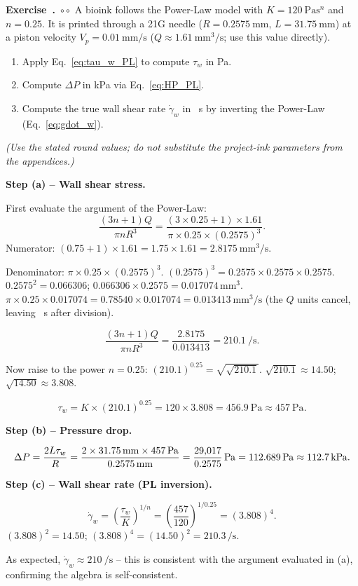 \documentclass[11pt,a4paper]{article}
\newcommand{\diffB}{\textcolor{orange!80!black}{$\circ\circ$}}
\newcounter{exidx}[section]
\renewcommand{\theexidx}{\thesection.\arabic{exidx}}
\newenvironment{exercise}[1]%
  {\par\smallskip\refstepcounter{exidx}%
   \noindent\textbf{Exercise~\theexidx}~#1\quad}
  {\par\smallskip}
\newcommand{\gd}{\dot{\gamma}}
\begin{document}
\begin{exercise}{\diffB}
A bioink follows the Power-Law model with $K=\SI{120}{\Pa\s^n}$ and
$n=0.25$. It is printed through a 21G needle ($R=\SI{0.2575}{\mm}$,
$L=\SI{31.75}{\mm}$) at a piston velocity $V_p=\SI{0.01}{\mm/\s}$
($Q\approx\SI{1.61}{\mm^3/\s}$; use this value directly).
\begin{enumerate}[label=(\alph*),leftmargin=1.6em,itemsep=1pt]
  \item Apply Eq.~\ref{eq:tau_w_PL} to compute $\tau_w$ in \si{\Pa}.
  \item Compute $\Delta P$ in \si{\kPa} via Eq.~\ref{eq:HP_PL}.
  \item Compute the true wall shear rate $\gd_w$ in \si{\per\s} by
    inverting the Power-Law (Eq.~\ref{eq:gdot_w}).
\end{enumerate}
\textit{(Use the stated round values; do not substitute the project-ink
parameters from the appendices.)}
\begin{solution}
\textbf{Step (a) -- Wall shear stress.}

First evaluate the argument of the Power-Law:
\[
\frac{(3n+1)Q}{\pi n R^3}
= \frac{(3\times0.25+1)\times1.61}{\pi\times0.25\times(0.2575)^3}.
\]
Numerator: $(0.75+1)\times1.61 = 1.75\times1.61 = \SI{2.8175}{\mm^3/\s}$.

Denominator: $\pi\times0.25\times(0.2575)^3$.
$(0.2575)^3 = 0.2575\times0.2575\times0.2575$.
$0.2575^2 = 0.066306$; $0.066306\times0.2575 = 0.017074\,\si{\mm^3}$.
$\pi\times0.25\times0.017074 = 0.78540\times0.017074 = \SI{0.013413}{\mm^3/\s}$
(the $Q$ units cancel, leaving \si{\per\s} after division).

\[
\frac{(3n+1)Q}{\pi n R^3}
= \frac{2.8175}{0.013413} = \SI{210.1}{\per\s}.
\]

Now raise to the power $n=0.25$:
$(210.1)^{0.25} = \sqrt{\sqrt{210.1}}$.
$\sqrt{210.1}\approx14.50$; $\sqrt{14.50}\approx3.808$.

\[
\tau_w = K\times(210.1)^{0.25} = 120\times3.808 = \SI{456.9}{\Pa}
       \approx \SI{457}{\Pa}.
\]

\textbf{Step (b) -- Pressure drop.}

\[
\Delta P = \frac{2L\tau_w}{R}
         = \frac{2\times31.75\,\si{\mm}\times457\,\si{\Pa}}{0.2575\,\si{\mm}}
         = \frac{29{,}017}{0.2575}\,\si{\Pa}
         = \SI{112{,}689}{\Pa}
         \approx \SI{112.7}{\kPa}.
\]

\textbf{Step (c) -- Wall shear rate (PL inversion).}

\[
\gd_w = \left(\frac{\tau_w}{K}\right)^{1/n}
      = \left(\frac{457}{120}\right)^{1/0.25}
      = (3.808)^{4}.
\]
$(3.808)^2 = 14.50$; $(3.808)^4 = (14.50)^2 = 210.3\,\si{\per\s}$.

As expected, $\gd_w\approx\SI{210}{\per\s}$ -- this is consistent with
the argument evaluated in (a), confirming the algebra is self-consistent.
\end{solution}
\end{exercise}
\end{document}

